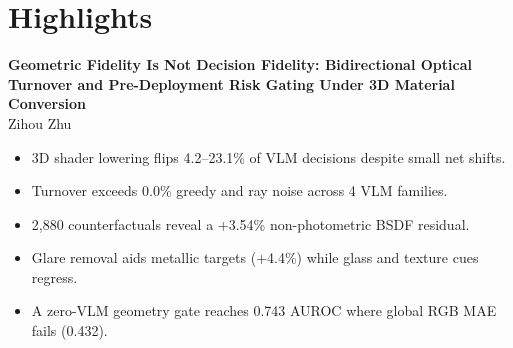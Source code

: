 \documentclass[11pt,a4paper]{article}
\begin{document}
\section*{Highlights}
\textbf{Geometric Fidelity Is Not Decision Fidelity: Bidirectional Optical Turnover and Pre-Deployment Risk Gating Under 3D Material Conversion}\\
Zihou Zhu

\begin{itemize}
\item 3D shader lowering flips 4.2--23.1\% of VLM decisions despite small net shifts.
\item Turnover exceeds 0.0\% greedy and ray noise across 4 VLM families.
\item 2,880 counterfactuals reveal a +3.54\% non-photometric BSDF residual.
\item Glare removal aids metallic targets (+4.4\%) while glass and texture cues regress.
\item A zero-VLM geometry gate reaches 0.743 AUROC where global RGB MAE fails (0.432).
\end{itemize}
\end{document}
